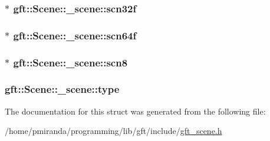 \subsubsection[{\texorpdfstring{scn32f}{scn32f}}]{$\ast$ gft\+::\+Scene\+::\+\_\+scene\+::scn32f}\hypertarget{structgft_1_1Scene_1_1__scene_a92e7c0a96c2dab89917ad81d0c39bf3a}{}\label{structgft_1_1Scene_1_1__scene_a92e7c0a96c2dab89917ad81d0c39bf3a}
\subsubsection[{\texorpdfstring{scn64f}{scn64f}}]{$\ast$ gft\+::\+Scene\+::\+\_\+scene\+::scn64f}\hypertarget{structgft_1_1Scene_1_1__scene_a7a635c7c4abf82e0fe0740510c54b775}{}\label{structgft_1_1Scene_1_1__scene_a7a635c7c4abf82e0fe0740510c54b775}
\subsubsection[{\texorpdfstring{scn8}{scn8}}]{$\ast$ gft\+::\+Scene\+::\+\_\+scene\+::scn8}\hypertarget{structgft_1_1Scene_1_1__scene_a8fe4664ea98a23e82a062375e72ec42e}{}\label{structgft_1_1Scene_1_1__scene_a8fe4664ea98a23e82a062375e72ec42e}
\subsubsection[{\texorpdfstring{type}{type}}]{ gft\+::\+Scene\+::\+\_\+scene\+::type}\hypertarget{structgft_1_1Scene_1_1__scene_a40b5c581b52b256d8a2fce38b3bfca99}{}\label{structgft_1_1Scene_1_1__scene_a40b5c581b52b256d8a2fce38b3bfca99}


The documentation for this struct was generated from the following file\+:\begin{DoxyCompactItemize}
\item 
/home/pmiranda/programming/lib/gft/include/\hyperlink{gft__scene_8h}{gft\+\_\+scene.\+h}\end{DoxyCompactItemize}
